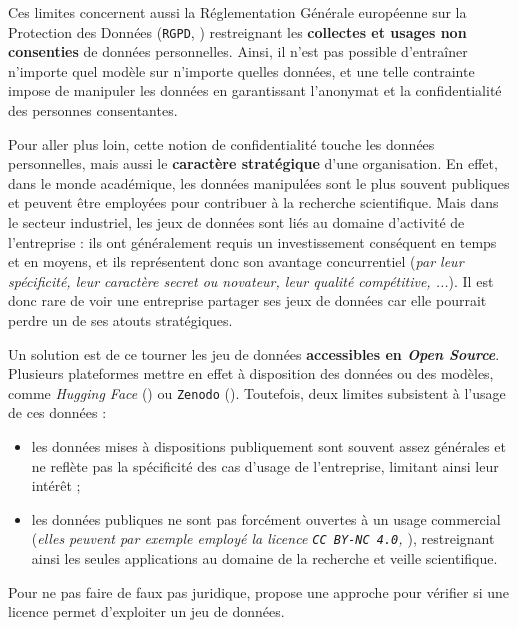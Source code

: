 			Ces limites concernent aussi la Réglementation Générale européenne sur la Protection des Données (\texttt{RGPD}, \cite{european-commission:2016:regulation-eu-2016}) restreignant les \textbf{collectes et usages non consenties} de données personnelles.
			Ainsi, il n'est pas possible d’entraîner n'importe quel modèle sur n'importe quelles données, et une telle contrainte impose de manipuler les données en garantissant l'anonymat et la confidentialité des personnes consentantes.
			
			Pour aller plus loin, cette notion de confidentialité touche les données personnelles, mais aussi le \textbf{caractère stratégique} d'une organisation.
			En effet, dans le monde académique, les données manipulées sont le plus souvent publiques et peuvent être employées pour contribuer à la recherche scientifique.
			Mais dans le secteur industriel, les jeux de données sont liés au domaine d'activité de l'entreprise : ils ont généralement requis un investissement conséquent en temps et en moyens, et ils représentent donc son avantage concurrentiel (\textit{par leur spécificité, leur caractère secret ou novateur, leur qualité compétitive, ...}).
			Il est donc rare de voir une entreprise partager ses jeux de données car elle pourrait perdre un de ses atouts stratégiques.
			
			Un solution est de ce tourner les jeu de données \textbf{accessibles en \textit{Open Source}}.
			Plusieurs plateformes mettre en effet à disposition des données ou des modèles, comme \textit{Hugging Face} (\cite{hugging-face:2016:hugging-face-ai}) ou \texttt{Zenodo} (\cite{re3data.org:2013:zenodo}).
			Toutefois, deux limites subsistent à l'usage de ces données :
			\begin{itemize}
				\item les données mises à dispositions publiquement sont souvent assez générales et ne reflète pas la spécificité des cas d'usage de l'entreprise, limitant ainsi leur intérêt ;
				\item les données publiques ne sont pas forcément ouvertes à un usage commercial (\textit{elles peuvent par exemple employé la licence \texttt{CC BY-NC 4.0}, \cite{creative-commons:2013:cc-bync-legal}}), restreignant ainsi les seules applications au domaine de la recherche et veille scientifique.
			\end{itemize}
			Pour ne pas faire de faux pas juridique, \cite{rajbahadur-etal:2022:can-use-this} propose une approche pour vérifier si une licence permet d'exploiter un jeu de données.
			
